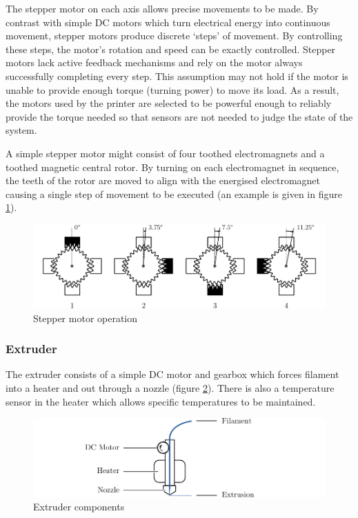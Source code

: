 				The stepper motor on each axis allows precise movements to be made. By
				contrast with simple DC motors which turn electrical energy into
				continuous movement, stepper motors produce discrete `steps' of
				movement. By controlling these steps, the motor's rotation and speed can
				be exactly controlled. Stepper motors lack active feedback mechanisms
				and rely on the motor always successfully completing every step. This
				assumption may not hold if the motor is unable to provide enough torque
				(turning power) to move its load. As a result, the motors used by the
				printer are selected to be powerful enough to reliably provide the
				torque needed so that sensors are not needed to judge the state of the
				system.
				
				A simple stepper motor might consist of four toothed electromagnets and
				a toothed magnetic central rotor. By turning on each electromagnet in
				sequence, the teeth of the rotor are moved to align with the energised
				electromagnet causing a single step of movement to be executed (an
				example is given in figure \ref{fig:stepperMotor}).
				
				\begin{figure}
					\includegraphics[width=1\textwidth]{diagrams/stepperMotor.pdf}
					\caption{Stepper motor operation}
					\label{fig:stepperMotor}
				\end{figure}
				
			\subsubsection{Extruder}
				
				The extruder consists of a simple DC motor and gearbox which forces
				filament into a heater and out through a nozzle (figure
				\ref{fig:extruder}). There is also a temperature sensor in the heater
				which allows specific temperatures to be maintained.
				
				\begin{figure}
					\includegraphics[width=1\textwidth]{diagrams/extruder.pdf}
					\caption{Extruder components}
					\label{fig:extruder}
				\end{figure}
				
